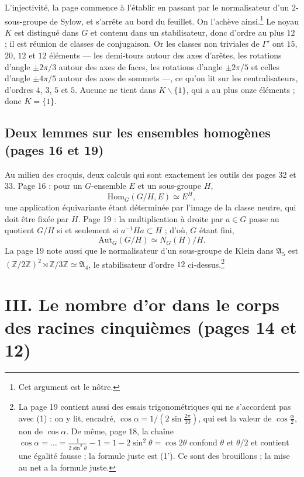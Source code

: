 \documentclass[11pt,a4paper]{article}
\begin{document}
L'injectivité, la page commence à l'établir en passant par le normalisateur
d'un $2$-sous-groupe de Sylow, et s'arrête au bord du feuillet. On l'achève
ainsi.\footnote{Cet argument est le nôtre.} Le noyau $K$ est distingué dans
$G$ et contenu dans un stabilisateur, donc d'ordre au plus $12$ ; il est
réunion de classes de conjugaison. Or les classes non triviales de $\Gamma'$
ont $15$, $20$, $12$ et $12$ éléments --- les demi-tours autour des axes
d'arêtes, les rotations d'angle $\pm 2\pi/3$ autour des axes de faces, les
rotations d'angle $\pm 2\pi/5$ et celles d'angle $\pm 4\pi/5$ autour des axes
de sommets ---, ce qu'on lit sur les centralisateurs, d'ordres $4$, $3$, $5$
et $5$. Aucune ne tient dans $K \smallsetminus \{1\}$, qui a au plus onze
éléments ; donc $K = \{1\}$.

\subsection*{Deux lemmes sur les ensembles homogènes (pages 16 et 19)}

Au milieu des croquis, deux calculs qui sont exactement les outils des pages
32 et 33. Page 16 : pour un $G$-ensemble $E$ et un sous-groupe $H$,
\[
\mathrm{Hom}_G(G/H, E) \simeq E^{H},
\]
une application équivariante étant déterminée par l'image de la classe
neutre, qui doit être fixée par $H$. Page 19 : la multiplication à droite
par $a \in G$ passe au quotient $G/H$ si et seulement si $a^{-1}Ha \subset H$ ;
d'où, $G$ étant fini,
\[
\mathrm{Aut}_G(G/H) \simeq N_G(H)/H .
\]
La page 19 note aussi que le normalisateur d'un sous-groupe de Klein dans
$\mathfrak{A}_5$ est $(\mathbb{Z}/2\mathbb{Z})^{2} \rtimes \mathbb{Z}/3\mathbb{Z} \simeq \mathfrak{A}_4$,
le stabilisateur d'ordre $12$ ci-dessus.\footnote{La page 19 contient aussi
des essais trigonométriques qui ne s'accordent pas avec (1) : on y lit,
encadré, $\cos\alpha = 1/(2\sin\frac{2\pi}{10})$, qui est la valeur de
$\cos\frac{\alpha}{2}$, non de $\cos\alpha$. De même, page 18, la chaîne
$\cos\alpha = \ldots = \frac{1}{2\sin^{2}\theta} - 1 = 1 - 2\sin^{2}\theta = \cos 2\theta$
confond $\theta$ et $\theta/2$ et contient une égalité fausse ; la formule
juste est (1'). Ce sont des brouillons ; la mise au net a la formule juste.}

\section*{III. Le nombre d'or dans le corps des racines cinquièmes (pages 14 et 12)}
\end{document}
